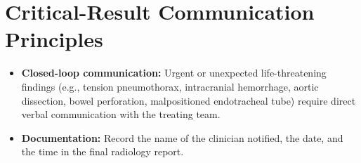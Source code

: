 \section{Critical-Result Communication Principles}
\begin{itemize}
    \item \textbf{Closed-loop communication:} Urgent or unexpected life-threatening findings (e.g., tension pneumothorax, intracranial hemorrhage, aortic dissection, bowel perforation, malpositioned endotracheal tube) require direct verbal communication with the treating team.
    \item \textbf{Documentation:} Record the name of the clinician notified, the date, and the time in the final radiology report.
\end{itemize}
